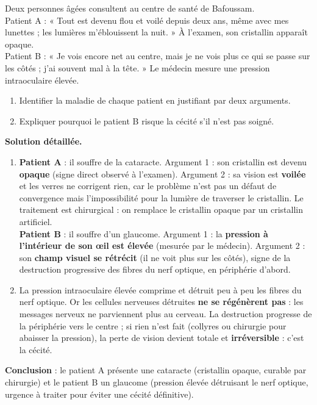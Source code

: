 \documentclass[11pt]{article}
\newcommand{\cle}[1]{{\popxbold\color{popdark}#1}}
\begin{document}
\begin{exoresolu}
Deux personnes âgées consultent au centre de santé de Bafoussam.\\
Patient A : « Tout est devenu flou et voilé depuis deux ans, même avec mes lunettes ; les lumières m'éblouissent la nuit. » À l'examen, son cristallin apparaît opaque.\\
Patient B : « Je vois encore net au centre, mais je ne vois plus ce qui se passe sur les côtés ; j'ai souvent mal à la tête. » Le médecin mesure une pression intraoculaire élevée.
\begin{enumerate}
\item Identifier la maladie de chaque patient en justifiant par deux arguments.
\item Expliquer pourquoi le patient B risque la cécité s'il n'est pas soigné.
\end{enumerate}
\tcblower
\textbf{Solution détaillée.}
\begin{enumerate}
\item \textbf{Patient A} : il souffre de la \cle{cataracte}. Argument 1 : son cristallin est devenu \textbf{opaque} (signe direct observé à l'examen). Argument 2 : sa vision est \textbf{voilée} et les verres ne corrigent rien, car le problème n'est pas un défaut de convergence mais l'impossibilité pour la lumière de traverser le cristallin. Le traitement est chirurgical : on remplace le cristallin opaque par un cristallin artificiel.\\
\textbf{Patient B} : il souffre d'un \cle{glaucome}. Argument 1 : la \textbf{pression à l'intérieur de son œil est élevée} (mesurée par le médecin). Argument 2 : son \textbf{champ visuel se rétrécit} (il ne voit plus sur les côtés), signe de la destruction progressive des fibres du nerf optique, en périphérie d'abord.
\item La pression intraoculaire élevée comprime et détruit peu à peu les fibres du \cle{nerf optique}. Or les cellules nerveuses détruites \textbf{ne se régénèrent pas} : les messages nerveux ne parviennent plus au cerveau. La destruction progresse de la périphérie vers le centre ; si rien n'est fait (collyres ou chirurgie pour abaisser la pression), la perte de vision devient totale et \textbf{irréversible} : c'est la cécité.
\end{enumerate}
\textbf{Conclusion} : le patient A présente une cataracte (cristallin opaque, curable par chirurgie) et le patient B un glaucome (pression élevée détruisant le nerf optique, urgence à traiter pour éviter une cécité définitive).
\end{exoresolu}
\end{document}
